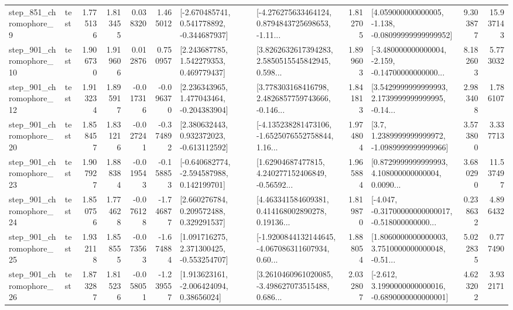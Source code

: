 \begin{tabular}{llrrrrllrlrr}
   step\_851\_chromophore\_9 &      test &      1.775136 &    1.813455 &      0.038320 &  1.465012 &   [-2.670485741, 0.541778892, -0.344687937] &  [-4.276275633464124, 0.8794843725698653, -1.11... &       1.812705 &  [4.059000000000005, -1.138, -0.08099999999999952] &            9.303877 &         15.937143 \\
  step\_901\_chromophore\_10 &      test &      1.906730 &    1.919606 &      0.012876 &  0.750957 &     [2.243687785, 1.542279353, 0.469779437] &  [3.8262632617394283, 2.5850515545842945, 0.598... &       1.899603 &  [-3.480000000000004, -2.159, -0.14700000000000... &            8.182603 &          5.773032 \\
  step\_901\_chromophore\_12 &      test &      1.913234 &    1.895917 &     -0.017316 & -0.096370 &    [2.236343965, 1.477043464, -0.204383904] &  [3.778303168416798, 2.4826857759743666, -0.146... &       1.841813 &  [3.5429999999999993, 2.1739999999999995, -0.14... &            2.983408 &          1.786107 \\
  step\_901\_chromophore\_20 &      test &      1.858457 &    1.831216 &     -0.027241 & -0.374892 &    [2.380632443, 0.932372023, -0.613112592] &  [-4.135238281473106, -1.6525076552758844, 1.16... &       1.974804 &     [3.7, 1.2389999999999972, -1.0989999999999966] &            3.573800 &          3.337713 \\
  step\_901\_chromophore\_23 &      test &      1.907927 &    1.888384 &     -0.019543 & -0.158853 &   [-0.640682774, -2.594587988, 0.142199701] &  [1.62904687477815, 4.240277152406849, -0.56592... &       1.965884 &  [0.8729999999999993, 4.108000000000004, 0.0090... &            3.680290 &         11.537497 \\
  step\_901\_chromophore\_24 &      test &      1.850756 &    1.774628 &     -0.076128 & -1.746877 &     [2.660276784, 0.209572488, 0.329291537] &  [4.463341584609381, 0.414168002890278, 0.19136... &       1.819870 &  [-4.047, -0.31700000000000017, -0.518000000000... &            0.238632 &          4.896432 \\
  step\_901\_chromophore\_25 &      test &      1.932118 &    1.858555 &     -0.073563 & -1.674884 &    [1.091716275, 2.371300425, -0.553254707] &  [-1.9200844132144645, -4.067086311607934, 0.60... &       1.888054 &  [1.8060000000000003, 3.7510000000000048, -0.51... &            5.022835 &          0.777490 \\
  step\_901\_chromophore\_26 &      test &      1.873287 &    1.815236 &     -0.058051 & -1.239557 &     [1.913623161, -2.006424094, 0.38656024] &  [3.2610460961020085, -3.498627073515488, 0.686... &       2.032807 &  [-2.612, 3.1990000000000016, -0.6890000000000001] &            4.623202 &          3.932171 \\

\end{tabular}
